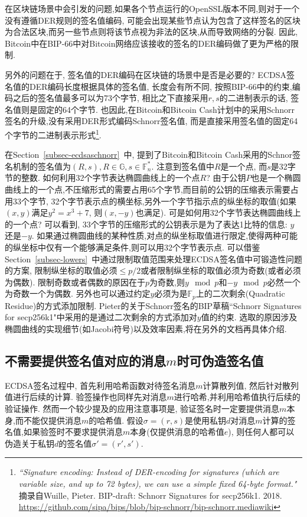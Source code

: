\documentclass{article}
\renewcommand{\G}{\mathbb{G}}
\newcommand{\F}{\mathbb{F}}
\begin{document}
在区块链场景中会引发的问题,如果各个节点运行的OpenSSL版本不同,则对于一个没有遵循DER规则的签名值编码,
可能会出现某些节点认为包含了这样签名的区块为合法区块,而另一些节点则将该节点视为非法的区块,从而导致网络的分裂.
因此, Bitcoin中在BIP-66中对Bitcoin网络应该接收的签名的DER编码做了更为严格的限制.

另外的问题在于, 签名值的DER编码在区块链的场景中是否是必要的? ECDSA签名值的DER编码长度根据具体的签名值,
长度会有所不同, 按照BIP-66中的约束,编码之后的签名值最多可以为73个字节, 相比之下直接采用$r, s$的二进制表示的话,
签名值则是固定的64个字节. 也因此,在Bitcoin和Bitcoin Cash计划中的采用Schnorr签名的升级,没有采用DER形式编码Schnorr签名值,
而是直接采用签名值的固定64个字节的二进制表示形式\footnote{
\textit{``Signature encoding: Instead of DER-encoding for signatures (which are variable size, and up to 72 bytes), we can use a simple fixed 64-byte format."} 
摘录自Wuille, Pieter. BIP-draft: Schnorr Signatures for secp256k1. 2018. 
\url{https://github.com/sipa/bips/blob/bip-schnorr/bip-schnorr.mediawiki}
}.

在Section~\ref{subsec-ecdsaschnorr}~中, 提到了Bitcoin和Bitcoin Cash采用的Schnor签名机制的签名值为$(R,s), R\in \G, s\in \F_n^*$.
注意到签名值中$R$是一个点, 而$s$是32字节的整数. 如何利用32个字节表达椭圆曲线上的一个点$R$? 
由于公钥$P$也是一个椭圆曲线上的一个点,不压缩形式的需要占用65个字节,而目前的公钥的压缩表示需要占用$33$个字节,
32个字节表示点的横坐标,另外一个字节指示点的纵坐标的取值(如果$(x, y)$满足$y^2=x^3 + 7$, 则$(x, -y)$也满足).
可是如何用32个字节表达椭圆曲线上的一个点? 可以看到, 33个字节的压缩形式的公钥表示是为了表达1比特的信息: $y$还是$-y$.
如果通过椭圆曲线的某种性质,对点的纵坐标取值进行限定,使得两种可能的纵坐标中仅有一个能够满足条件,则可以用32个字节表示点.
可以借鉴Section~\ref{subsec-lowers}~中通过限制取值范围来处理ECDSA签名值中可锻造性问题的方案, 
限制纵坐标的取值必须$\leq p/2$或者限制纵坐标的取值必须为奇数(或者必须为偶数). 
限制奇数或者偶数的原因在于$p$为奇数,则$y \mod p$和$-y \mod p$必然一个为奇数一个为偶数.
另外也可以通过约定$y$必须为是$\F_p$上的二次剩余(Quadratic Residue)的方式添加限制.
Pieter的关于Schnorr签名的BIP草稿``Schnorr Signatures for secp256k1"中采用的是通过二次剩余的方式添加对$y$值的约束.
选取的原因涉及椭圆曲线的实现细节(如Jacobi符号)以及效率因素,将在另外的文档再具体介绍.

\subsection{不需要提供签名值对应的消息$m$时可伪造签名值}

ECDSA签名过程中, 首先利用哈希函数对待签名消息$m$计算散列值, 然后针对散列值进行后续的计算.
验签操作也同样先对消息$m$进行哈希,并利用哈希值执行后续的验证操作.
然而一个较少提及的应用注意事项是, 验证签名时一定要提供消息$m$本身,而不能仅提供消息$m$的哈希值.
假设$\sigma=(r, s)$是使用私钥$d$对消息$m$计算的签名值,如果验签时不要求提供消息$m$本身(仅提供消息的哈希值$e$),
则任何人都可以伪造关于私钥$d$的签名值$\sigma'=(r', s')$.
\end{document}
